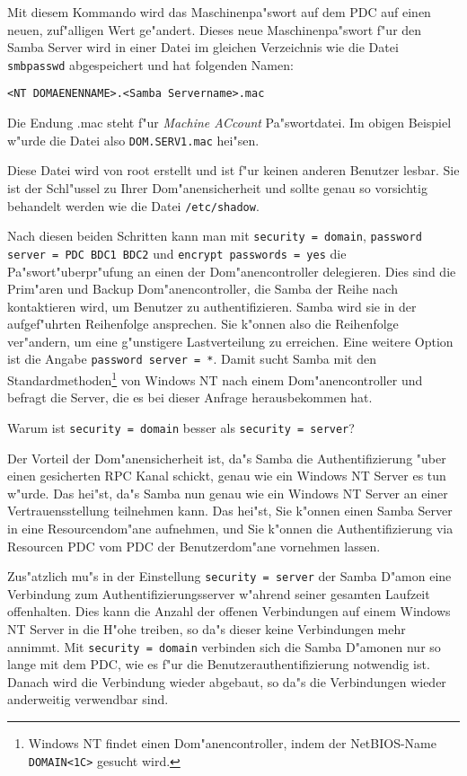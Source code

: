 \documentclass{scrartcl}
\newcommand{\param}{\texttt}
\newcommand{\nbname}{\texttt}
\begin{document}
Mit diesem Kommando wird das Maschinenpa"swort auf dem PDC auf einen
neuen, zuf"alligen Wert ge"andert. Dieses neue Maschinenpa"swort f"ur
den Samba Server wird in einer Datei im gleichen Verzeichnis wie die
Datei \texttt{smbpasswd} abgespeichert und hat folgenden Namen:

\verb|<NT DOMAENENNAME>.<Samba Servername>.mac|

Die Endung .mac steht f"ur \emph{Machine ACcount} Pa"swortdatei. Im obigen
Beispiel w"urde die Datei also \texttt{DOM.SERV1.mac} hei"sen.

Diese Datei wird von root erstellt und ist f"ur keinen anderen
Benutzer lesbar. Sie ist der Schl"ussel zu Ihrer Dom"anensicherheit
und sollte genau so vorsichtig behandelt werden wie die Datei
\texttt{/etc/shadow}.

Nach diesen beiden Schritten kann man mit \param{security = domain},
\param{password server = PDC BDC1 BDC2} und \param{encrypt passwords =
  yes} die Pa"swort"uberpr"ufung an einen der Dom"anencontroller
delegieren. Dies sind die Prim"aren und Backup Dom"anencontroller, die
Samba der Reihe nach kontaktieren wird, um Benutzer zu
authentifizieren. Samba wird sie in der aufgef"uhrten Reihenfolge
ansprechen. Sie k"onnen also die Reihenfolge ver"andern, um eine
g"unstigere Lastverteilung zu erreichen. Eine weitere Option ist die
Angabe \param{password server = *}. Damit sucht Samba mit den
Standardmethoden\footnote{Windows NT findet einen Dom"anencontroller,
  indem der NetBIOS-Name \nbname{DOMAIN<1C>} gesucht wird.} von
Windows NT nach einem Dom"anencontroller und befragt die Server, die
es bei dieser Anfrage herausbekommen hat.

Warum ist \param{security = domain} besser als \param{security =
  server}?

Der Vorteil der Dom"anensicherheit ist, da"s Samba die
Authentifizierung "uber einen gesicherten RPC Kanal schickt, genau wie
ein Windows NT Server es tun w"urde. Das hei"st, da"s Samba nun genau
wie ein Windows NT Server an einer Vertrauensstellung teilnehmen kann.
Das hei"st, Sie k"onnen einen Samba Server in eine Resourcendom"ane
aufnehmen, und Sie k"onnen die Authentifizierung via Resourcen PDC vom
PDC der Benutzerdom"ane vornehmen lassen.

Zus"atzlich mu"s in der Einstellung \texttt{security = server} der
Samba D"amon eine Verbindung zum Authentifizierungsserver w"ahrend
seiner gesamten Laufzeit offenhalten. Dies kann die Anzahl der offenen
Verbindungen auf einem Windows NT Server in die H"ohe treiben, so da"s
dieser keine Verbindungen mehr annimmt. Mit \texttt{security = domain}
verbinden sich die Samba D"amonen nur so lange mit dem PDC, wie es
f"ur die Benutzerauthentifizierung notwendig ist. Danach wird die
Verbindung wieder abgebaut, so da"s die Verbindungen wieder
anderweitig verwendbar sind.
\end{document}
